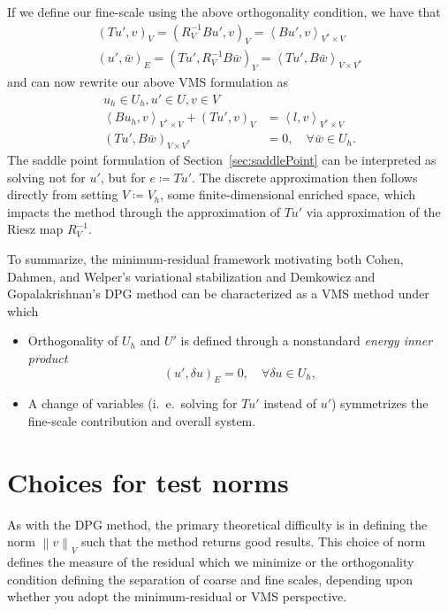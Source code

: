\documentclass[final,leqno]{siamltex}
\newcommand{\nor}[1]{\left\| #1 \right\|}
\newcommand{\LRp}[1]{\left( #1 \right)}
\newcommand{\LRa}[1]{\left\langle #1 \right\rangle}
\begin{document}
If we define our fine-scale using the above orthogonality condition, we have that
\begin{align*}
\LRp{Tu',v}_V = \LRp{R_V^{-1}Bu',v}_V = \LRa{Bu',v}_{V^*\times V}\\
\LRp{u',\bar{w}}_E = \LRp{Tu',R_V^{-1}B\bar{w}}_V = \LRa{Tu',B\bar{w}}_{V\times V^*}
\end{align*}
and can now rewrite our above VMS formulation as 
\begin{align*}
u_h \in U_h, u' \in U, v \in V\\
\LRa{Bu_h,v}_{V^*\times V} + \LRp{Tu',v}_{V} &= \LRa{l,v}_{V^*\times V}\\
\LRp{Tu',B\bar{w}}_{V\times V^*} &= 0, \quad \forall \bar{w} \in U_h.
\end{align*}
The saddle point formulation of Section~\ref{sec:saddlePoint} can be interpreted as solving not for $u'$, but for $e\coloneqq Tu'$.  The discrete approximation then follows directly from setting $V \coloneqq V_h$, some finite-dimensional enriched space, which impacts the method through the approximation of $Tu'$ via approximation of the Riesz map $R_V^{-1}$.  

To summarize, the minimum-residual framework motivating both Cohen, Dahmen, and Welper's variational stabilization and Demkowicz and Gopalakrishnan's DPG method can be characterized as a VMS method under which 
\begin{itemize}
\item Orthogonality of $U_h$ and $U'$ is defined through a nonstandard \textit{energy inner product} $$\LRp{u',\delta u}_E = 0, \quad\forall \delta u \in U_h,$$ 
\item A change of variables (i.\ e.\ solving for $Tu'$ instead of $u'$) symmetrizes the fine-scale contribution and overall system.
\end{itemize}

\section{Choices for test norms}

As with the DPG method, the primary theoretical difficulty is in defining the norm $\nor{v}_V$ such that the method returns good results.  This choice of norm defines the measure of the residual which we minimize or the orthogonality condition defining the separation of coarse and fine scales, depending upon whether you adopt the minimum-residual or VMS perspective.  
\end{document}

